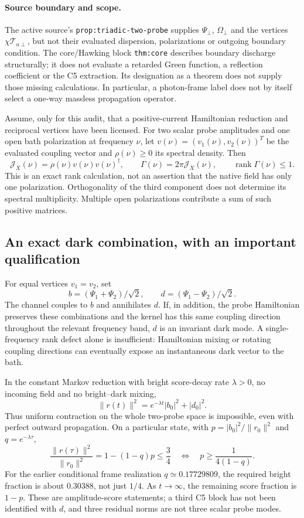 \documentclass[11pt,a4paper]{article}
\begin{document}
\paragraph{Source boundary and scope.}
The active source's \texttt{prop:triadic-two-probe} supplies
$\Psi_\perp$, $\Omega_\perp$ and the vertices
$\chi\mathcal T_{a\perp}$, but not their evaluated dispersion,
polarizations or outgoing boundary condition. The core/Hawking
block \texttt{thm:core} describes boundary discharge structurally;
it does not evaluate a retarded Green function, a reflection
coefficient or the C5 extraction. Its designation as a theorem
does not supply those missing calculations. In particular, a
photon-frame label does not by itself select a one-way massless
propagation operator.

Assume, only for this audit, that a positive-current Hamiltonian
reduction and reciprocal vertices have been licensed. For two
scalar probe amplitudes and one open bath polarization at frequency
$\nu$, let $v(\nu)=(v_1(\nu),v_2(\nu))^T$ be the evaluated
coupling vector and $\rho(\nu)\geq0$ its spectral density. Then
\[
 \mathcal J_X(\nu)=\rho(\nu)v(\nu)v(\nu)^\dagger,
 \qquad \Gamma(\nu)=2\pi\mathcal J_X(\nu),
 \qquad \operatorname{rank}\Gamma(\nu)\leq1.
\]
This is an exact rank calculation, not an assertion that the native
field has only one polarization. Orthogonality of the third
component does not determine its spectral multiplicity. Multiple
open polarizations contribute a sum of such positive matrices.

\subsection{An exact dark combination, with an important qualification}

For equal vertices $v_1=v_2$, set
\[
 b=(\Psi_1+\Psi_2)/\sqrt2,\qquad
 d=(\Psi_1-\Psi_2)/\sqrt2.
\]
The channel couples to $b$ and annihilates $d$. If, in addition,
the probe Hamiltonian preserves these combinations and the kernel
has this same coupling direction throughout the relevant frequency
band, $d$ is an invariant dark mode. A single-frequency rank defect
alone is insufficient: Hamiltonian mixing or rotating coupling
directions can eventually expose an instantaneous dark vector to
the bath.

In the constant Markov reduction with bright score-decay rate
$\lambda>0$, no incoming field and no bright--dark mixing,
\[
 \|r(t)\|^2=e^{-\lambda t}|b_0|^2+|d_0|^2.
\]
Thus uniform contraction on the whole two-probe space is impossible,
even with perfect outward propagation. On a particular state, with
$p=|b_0|^2/\|r_0\|^2$ and $q=e^{-\lambda\tau}$,
\[
 \frac{\|r(\tau)\|^2}{\|r_0\|^2}=1-(1-q)p\leq\frac34
 \quad\Longleftrightarrow\quad
 p\geq\frac{1}{4(1-q)}.
\]
For the earlier conditional frame realization $q\simeq0.17729809$,
the required bright fraction is about $0.30388$, not just $1/4$.
As $t\to\infty$, the remaining score fraction is $1-p$. These are
amplitude-score statements; a third C5 block has not been identified
with $d$, and three residual norms are not three scalar probe modes.
\end{document}

